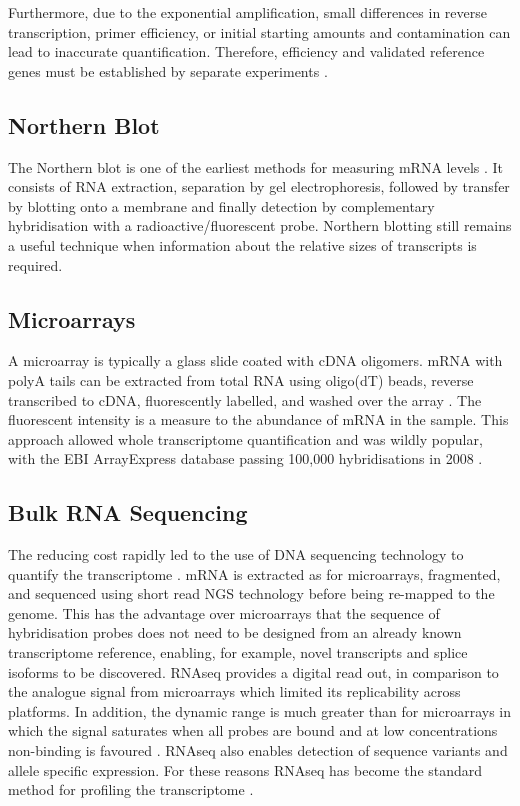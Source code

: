 Furthermore, due to the exponential amplification, small differences in reverse transcription, primer efficiency, or initial starting amounts and contamination can lead to inaccurate quantification. Therefore, efficiency and validated reference genes must be established by separate experiments \parencite{Bustin2009MIQE}.

\subsection{Northern Blot}
The Northern blot is one of the earliest methods for measuring mRNA levels \parencite{Alwine1977Method}. It consists of RNA extraction, separation by gel electrophoresis, followed by transfer by blotting onto a membrane and finally detection by complementary hybridisation with a radioactive/fluorescent probe. Northern blotting still remains a useful technique when information about the relative sizes of transcripts is required.

\subsection{Microarrays}
A microarray is typically a glass slide coated with cDNA oligomers. mRNA with polyA tails can be extracted from total RNA using oligo(dT) beads, reverse transcribed to cDNA, fluorescently labelled, and washed over the array \parencite{Schena1995Quantitative, DeRisi1996Use, Schulze2001Navigating}. The fluorescent intensity is a measure to the abundance of mRNA in the sample. This approach allowed whole transcriptome quantification and was wildly popular, with the EBI ArrayExpress database passing 100,000 hybridisations in 2008 \parencite{Rustici2008Data}.

\subsection{Bulk RNA Sequencing}
The reducing cost rapidly led to the use of DNA sequencing technology to quantify the transcriptome \parencite{Mortazavi2008Mapping, Cloonan2008Stem, Wilhelm2008Dynamic, Lister2008Highly, Nagalakshmi2008Transcriptional}. mRNA is extracted as for microarrays, fragmented, and sequenced using short read NGS technology before being re-mapped to the genome. This has the advantage over microarrays that the sequence of hybridisation probes does not need to be designed from an already known transcriptome reference, enabling, for example, novel transcripts and splice isoforms to be discovered. RNAseq provides a digital read out, in comparison to the analogue signal from microarrays which limited its replicability across platforms. In addition, the dynamic range is much greater than for microarrays in which the signal saturates when all probes are bound and at low concentrations non-binding is favoured \parencite{Zhao2014Comparison}. RNAseq also enables detection of sequence variants and allele specific expression. For these reasons RNAseq has become the standard method for profiling the transcriptome \parencite{Stark2019RNA}.

